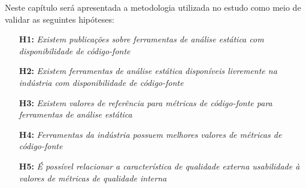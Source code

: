 \documentclass[qual, classic, a4paper]{ufbathesis}
\begin{document}
%
%

Neste capítulo será apresentada a metodologia utilizada no estudo como meio
de validar as seguintes hipóteses:

\begin{enumerate}
  \item[{\bf H1:}] {\em Existem publicações sobre ferramentas de análise
    estática com disponibilidade de código-fonte}
  \item[{\bf H2:}] {\em Existem ferramentas de análise estática disponíveis
    livremente na indústria com disponibilidade de código-fonte}
  \item[{\bf H3:}] {\em Existem valores de referência para métricas de
    código-fonte para ferramentas de análise estática}
  \item[{\bf H4:}] {\em Ferramentas da indústria possuem melhores valores de
    métricas de código-fonte}
  \item[{\bf H5:}] {\em É possível relacionar a característica de qualidade
    externa usabilidade à valores de métricas de qualidade interna}
\end{enumerate}
\end{document}
